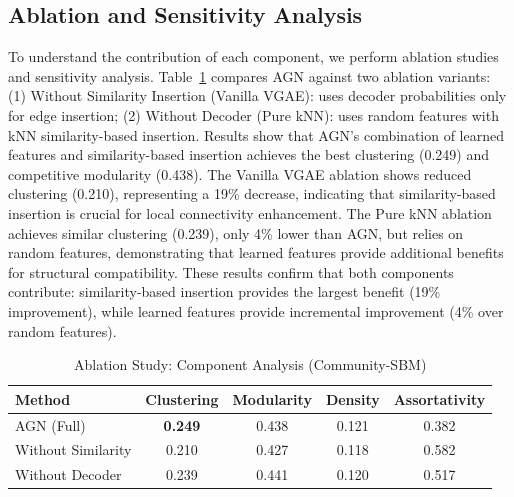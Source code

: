 \documentclass[12pt]{article}
\begin{document}
\subsection{Ablation and Sensitivity Analysis}

To understand the contribution of each component, we perform ablation studies and sensitivity analysis. Table~\ref{tab:ablation} compares AGN against two ablation variants: (1) Without Similarity Insertion (Vanilla VGAE): uses decoder probabilities only for edge insertion; (2) Without Decoder (Pure kNN): uses random features with kNN similarity-based insertion. Results show that AGN's combination of learned features and similarity-based insertion achieves the best clustering (0.249) and competitive modularity (0.438). The Vanilla VGAE ablation shows reduced clustering (0.210), representing a 19\% decrease, indicating that similarity-based insertion is crucial for local connectivity enhancement. The Pure kNN ablation achieves similar clustering (0.239), only 4\% lower than AGN, but relies on random features, demonstrating that learned features provide additional benefits for structural compatibility. These results confirm that both components contribute: similarity-based insertion provides the largest benefit (19\% improvement), while learned features provide incremental improvement (4\% over random features).

\begin{table}[h]
\centering
\caption{Ablation Study: Component Analysis (Community-SBM)}
\label{tab:ablation}
\small
\begin{tabular}{lcccc}
\toprule
Method & Clustering & Modularity & Density & Assortativity \\
\midrule
AGN (Full) & \textbf{0.249} & 0.438 & 0.121 & 0.382 \\
Without Similarity & 0.210 & 0.427 & 0.118 & 0.582 \\
Without Decoder & 0.239 & 0.441 & 0.120 & 0.517 \\
\bottomrule
\end{tabular}
\end{table}
\end{document}
